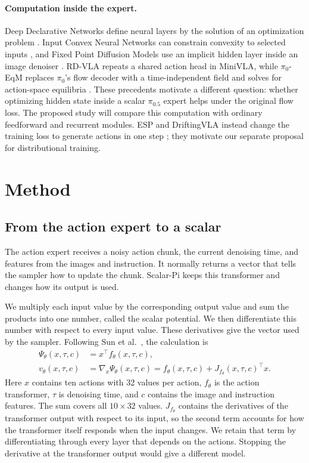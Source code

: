 \documentclass[10pt]{article}
\newcommand{\pihalf}{\pi_{0.5}}
\begin{document}
\paragraph{Computation inside the expert.}
Deep Declarative Networks define neural layers by the solution of an optimization problem \cite{gould2022ddn}. Input Convex Neural Networks can constrain convexity to selected inputs \cite{icnn}, and Fixed Point Diffusion Models use an implicit hidden layer inside an image denoiser \cite{fpdm}. RD-VLA repeats a shared action head in MiniVLA, while $\pi_0$-EqM replaces $\pi_0$'s flow decoder with a time-independent field and solves for action-space equilibria \cite{rdvla,pi0eqm}. These precedents motivate a different question: whether optimizing hidden state inside a scalar $\pihalf$ expert helps under the original flow loss. The proposed study will compare this computation with ordinary feedforward and recurrent modules. ESP and DriftingVLA instead change the training loss to generate actions in one step \cite{esp,driftingvla}; they motivate our separate proposal for distributional training.

\section{Method}


\subsection{From the action expert to a scalar}
The action expert receives a noisy action chunk, the current denoising time, and features from the images and instruction. It normally returns a vector that tells the sampler how to update the chunk. Scalar-Pi keeps this transformer and changes how its output is used.

We multiply each input value by the corresponding output value and sum the products into one number, called the scalar potential. We then differentiate this number with respect to every input value. These derivatives give the vector used by the sampler. Following Sun et al.\ \cite{composing}, the calculation is
\begin{align}
\Psi_\theta(x,\tau,c)&=x^\top f_\theta(x,\tau,c),\\
v_\theta(x,\tau,c)&=\nabla_x\Psi_\theta(x,\tau,c)
=f_\theta(x,\tau,c)+J_{f_\theta}(x,\tau,c)^\top x.
\end{align}
Here $x$ contains ten actions with 32 values per action, $f_\theta$ is the action transformer, $\tau$ is denoising time, and $c$ contains the image and instruction features. The sum covers all $10\times32$ values. $J_{f_\theta}$ contains the derivatives of the transformer output with respect to its input, so the second term accounts for how the transformer itself responds when the input changes. We retain that term by differentiating through every layer that depends on the actions. Stopping the derivative at the transformer output would give a different model.
\end{document}
